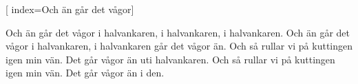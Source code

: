 [ 		
	index={Och än går det vågor}]		
	
\beginverse*						
Och än går det vågor i halvankaren,
i halvankaren, i halvankaren.
Och än går det vågor i halvankaren,
i halvankaren går det vågor än.
Och så rullar vi på kuttingen igen min vän.
Det går vågor än uti halvankaren.
Och så rullar vi på kuttingen igen min vän.
Det går vågor än i den.
\endverse										
\endsong		
